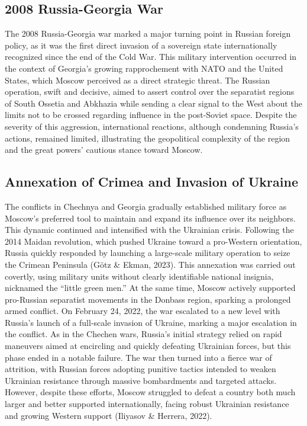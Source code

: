 \documentclass[12pt]{article}
\begin{document}
\subsection*{2008 Russia-Georgia War}
The 2008 Russia-Georgia war marked a major turning point in Russian foreign policy, as it was the first direct invasion of a sovereign state internationally recognized since the end of the Cold War. This military intervention occurred in the context of Georgia’s growing rapprochement with NATO and the United States, which Moscow perceived as a direct strategic threat. The Russian operation, swift and decisive, aimed to assert control over the separatist regions of South Ossetia and Abkhazia while sending a clear signal to the West about the limits not to be crossed regarding influence in the post-Soviet space. Despite the severity of this aggression, international reactions, although condemning Russia’s actions, remained limited, illustrating the geopolitical complexity of the region and the great powers’ cautious stance toward Moscow.

\subsection*{Annexation of Crimea and Invasion of Ukraine}
The conflicts in Chechnya and Georgia gradually established military force as Moscow’s preferred tool to maintain and expand its influence over its neighbors. This dynamic continued and intensified with the Ukrainian crisis. Following the 2014 Maidan revolution, which pushed Ukraine toward a pro-Western orientation, Russia quickly responded by launching a large-scale military operation to seize the Crimean Peninsula (Götz & Ekman, 2023). This annexation was carried out covertly, using military units without clearly identifiable national insignia, nicknamed the “little green men.” At the same time, Moscow actively supported pro-Russian separatist movements in the Donbass region, sparking a prolonged armed conflict.
On February 24, 2022, the war escalated to a new level with Russia’s launch of a full-scale invasion of Ukraine, marking a major escalation in the conflict. As in the Chechen wars, Russia’s initial strategy relied on rapid maneuvers aimed at encircling and quickly defeating Ukrainian forces, but this phase ended in a notable failure. The war then turned into a fierce war of attrition, with Russian forces adopting punitive tactics intended to weaken Ukrainian resistance through massive bombardments and targeted attacks. However, despite these efforts, Moscow struggled to defeat a country both much larger and better supported internationally, facing robust Ukrainian resistance and growing Western support (Iliyasov & Herrera, 2022).
\end{document}
